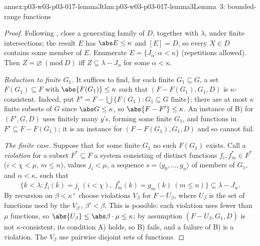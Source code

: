 \begin{annexitem}{annex:p03-w03-p03-017-lemma3}{thm:p03-w03-p03-017-lemma3}{Lemma~3: bounded-range functions}
\begin{proof}
Following \cite[pp.~227--228]{Shelah1971Ultrapowers}, close a generating
family of \(D\), together with \(\lambda\), under finite intersections; the
result \(E\) has \(\abs E\le\kappa\) and \([E]=D\), so every \(X\in D\)
contains some member of \(E\).  Enumerate \(E=\{J_\alpha:\alpha<\kappa\}\)
(repetitions allowed).  Then \(Z=\varnothing\ (\mathrm{mod}\ D)\) iff
\(Z\subseteq\lambda-J_\alpha\) for some \(\alpha<\kappa\).

\emph{Reduction to finite \(G_1\).}  It suffices to find, for each finite
\(G_1\subseteq G\), a set \(F(G_1)\subseteq F\) with
\(\abs{F(G_1)}\le\kappa\) such that \((F-F(G_1),G_1,D)\) is
\(\kappa\)-consistent.  Indeed, put
\(F'=F-\bigcup\{F(G_1):G_1\subseteq G\text{ finite}\}\); there are at most
\(\kappa\) finite subsets of \(G\) since \(\abs G\le\kappa\), so
\(\abs{F-F'}\le\kappa\).  An instance of B) for \((F',G,D)\) uses finitely
many \(g\)'s, forming some finite \(G_1\), and functions in
\(F'\subseteq F-F(G_1)\); it is an instance for \((F-F(G_1),G_1,D)\) and so
cannot fail.

\emph{The finite case.}  Suppose that for some finite \(G_1\) no such
\(F(G_1)\) exists.  Call a \emph{violation} for a subset \(F^*\subseteq F\) a
system consisting of distinct functions \(f_i,f^*_m\in F^*\)
(\(i<\chi<\mu\), \(m\le n\)), values \(j_i<\mu\), a sequence
\(s=\langle g_0,\ldots,g_n\rangle\) of members of \(G_1\), and
\(\alpha<\kappa\), such that
\[
 \{k<\lambda:f_i(k)=j_i\ (i<\chi),\ f^*_m(k)=g_m(k)\ (m\le n)\}
 \subseteq\lambda-J_\alpha .
\]
By recursion on \(\beta<\kappa^+\) choose violations \(V_\beta\) for
\(F-U_\beta\), where \(U_\beta\) is the set of functions used by the
\(V_{\beta'}\), \(\beta'<\beta\).  This is possible: each violation uses
fewer than \(\mu\) functions, so \(\abs{U_\beta}\le\abs\beta\cdot\mu\le\kappa\);
by assumption \((F-U_\beta,G_1,D)\) is not \(\kappa\)-consistent; its
condition A) holds, so B) fails, and a failure of B) is a violation.  The
\(V_\beta\) use pairwise disjoint sets of functions.


\end{proof}
\end{annexitem}
